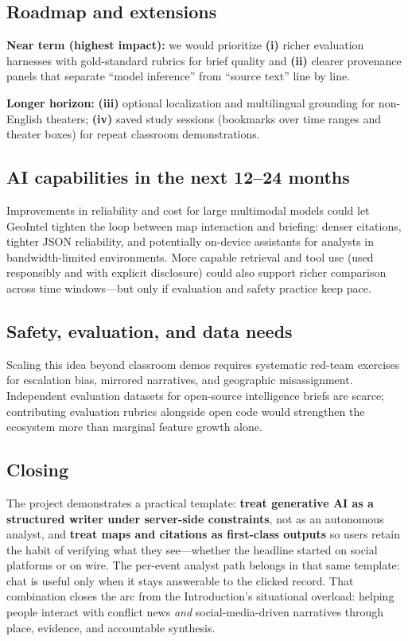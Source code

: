 \subsection{Roadmap and extensions}

\textbf{Near term (highest impact):} we would prioritize \textbf{(i)} richer evaluation harnesses with gold-standard rubrics for brief quality and \textbf{(ii)} clearer provenance panels that separate ``model inference'' from ``source text'' line by line.

\textbf{Longer horizon:} \textbf{(iii)} optional localization and multilingual grounding for non-English theaters; \textbf{(iv)} saved study sessions (bookmarks over time ranges and theater boxes) for repeat classroom demonstrations.

\subsection{AI capabilities in the next 12--24 months}

Improvements in reliability and cost for large multimodal models could let GeoIntel tighten the loop between map interaction and briefing: denser citations, tighter JSON reliability, and potentially on-device assistants for analysts in bandwidth-limited environments. More capable retrieval and tool use (used responsibly and with explicit disclosure) could also support richer comparison across time windows---but only if evaluation and safety practice keep pace.

\subsection{Safety, evaluation, and data needs}

Scaling this idea beyond classroom demos requires systematic red-team exercises for escalation bias, mirrored narratives, and geographic misassignment. Independent evaluation datasets for open-source intelligence briefs are scarce; contributing evaluation rubrics alongside open code would strengthen the ecosystem more than marginal feature growth alone.

\subsection{Closing}

The project demonstrates a practical template: \textbf{treat generative AI as a structured writer under server-side constraints}, not as an autonomous analyst, and \textbf{treat maps and citations as first-class outputs} so users retain the habit of verifying what they see---whether the headline started on social platforms or on wire. The per-event analyst path belongs in that same template: chat is useful only when it stays answerable to the clicked record. That combination closes the arc from the Introduction's situational overload: helping people interact with conflict news \emph{and} social-media-driven narratives through place, evidence, and accountable synthesis.
